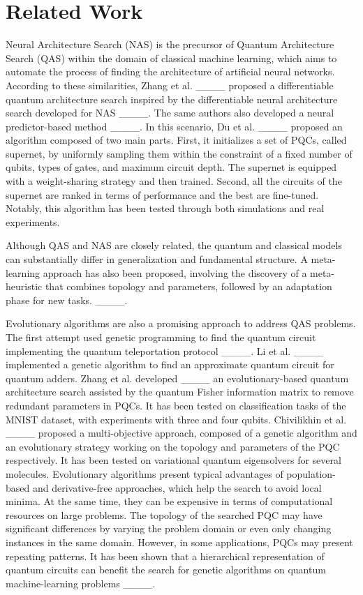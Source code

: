 \section{Related Work}
\label{related_works}
Neural Architecture Search (NAS) is the precursor of Quantum Architecture Search (QAS) within the domain of classical machine learning, which aims to automate the process of finding the architecture of artificial neural networks. According to these similarities, Zhang et al. ____ proposed a differentiable quantum architecture search inspired by the differentiable neural architecture search developed for NAS ____. The same authors also developed a neural predictor-based method ____. In this scenario, Du et al. ____ proposed an algorithm composed of two main parts. First, it initializes a set of PQCs, called supernet, by uniformly sampling them within the constraint of a fixed number of qubits, types of gates, and maximum circuit depth. The supernet is equipped with a weight-sharing strategy and then trained. Second, all the circuits of the supernet are ranked in terms of performance and the best are fine-tuned. Notably, this algorithm has been tested through both simulations and real experiments. 

\noindent Although QAS and NAS are closely related, the quantum and classical models can substantially differ in generalization and fundamental structure. A meta-learning approach has also been proposed, involving the discovery of a meta-heuristic that combines topology and parameters, followed by an adaptation phase for new tasks. ____.

Evolutionary algorithms are also a promising approach to address QAS problems. The first attempt used genetic programming to find the quantum circuit implementing the quantum teleportation protocol ____.  Li et al. ____ implemented a genetic algorithm to find an approximate quantum circuit for quantum adders. Zhang et al. developed ____ an evolutionary-based quantum architecture search assisted by the quantum Fisher information matrix to remove redundant parameters in PQCs. It has been tested on classification tasks of the MNIST dataset, with experiments with three and four qubits. Chivilikhin et al. ____ proposed a multi-objective approach, composed of a genetic algorithm and an evolutionary strategy working on the topology and parameters of the PQC respectively. It has been tested on variational quantum eigensolvers for several molecules. Evolutionary algorithms present typical advantages of population-based and derivative-free approaches, which help the search to avoid local minima. At the same time, they can be expensive in terms of computational resources on large problems. 
The topology of the searched PQC may have significant differences by varying the problem domain or even only changing instances in the same domain. However, in some applications, PQCs may present repeating patterns. It has been shown that a hierarchical representation of quantum circuits can benefit the search for genetic algorithms on quantum machine-learning problems ____.


